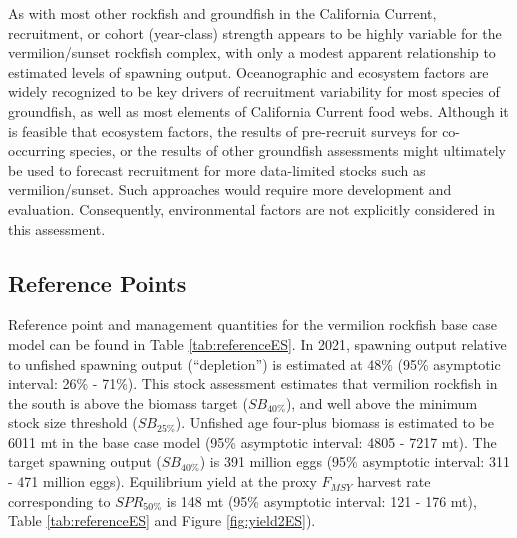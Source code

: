\documentclass[
  english,
  a4paper,
]{article}
\begin{document}
As with most other rockfish and groundfish in the California Current, recruitment,
or cohort (year-class) strength appears to be highly variable for the vermilion/sunset
rockfish complex, with only a modest apparent relationship to estimated levels of spawning output. Oceanographic and ecosystem factors are widely recognized to be key drivers of
recruitment variability for most species of groundfish, as well as most elements
of California Current food webs. Although it is feasible that
ecosystem factors, the results of pre-recruit surveys for co-occurring species,
or the results of other groundfish assessments might ultimately be used to
forecast recruitment for more data-limited stocks such as vermilion/sunset. Such approaches would require more
development and evaluation. Consequently, environmental factors are not
explicitly considered in this assessment.

\FloatBarrier

\hypertarget{reference-points}{%
\subsection*{Reference Points}\label{reference-points}}

Reference point and management quantities for the vermilion rockfish base case
model can be found in Table \ref{tab:referenceES}. In 2021, spawning output
relative to unfished spawning output (``depletion'') is estimated at
48\% (95\% asymptotic interval:
26\% - 71\%).
This stock assessment estimates that vermilion rockfish in the south is above
the biomass target (\(SB_{40\%}\)), and well above the minimum stock size
threshold (\(SB_{25\%}\)). Unfished age four-plus biomass is estimated to be
6011 mt in the base case model (95\% asymptotic interval:
4805 - 7217 mt).
The target spawning output (\(SB_{40\%}\)) is 391 million eggs
(95\% asymptotic interval: 311 - 471 million eggs).
Equilibrium yield at the proxy \(F_{MSY}\)
harvest rate corresponding to \(SPR_{50\%}\) is 148 mt
(95\% asymptotic interval: 121 - 176 mt),
Table \ref{tab:referenceES} and Figure \ref{fig:yield2ES}).
\end{document}

